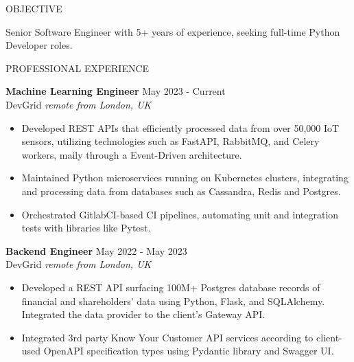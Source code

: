 \documentclass{resume} %
\begin{document}

\begin{rSection}{OBJECTIVE}

{Senior Software Engineer with 5+ years of experience, seeking full-time Python Developer roles.}


\end{rSection}

\begin{rSection}{PROFESSIONAL EXPERIENCE}

\textbf{Machine Learning Engineer} \hfill May 2023 - Current\\
DevGrid \hfill \textit{remote from London, UK}
 \begin{itemize}
    \itemsep -3pt {} 
     \item Developed REST APIs that efficiently processed data from over 50,000 IoT sensors, utilizing technologies such as FastAPI, RabbitMQ, and Celery workers, maily through a Event-Driven architecture.
     \item Maintained Python microservices running on Kubernetes clusters, integrating and processing data from databases such as Cassandra, Redis and Postgres.
     \item Orchestrated GitlabCI-based CI pipelines, automating unit and integration tests with libraries like Pytest.

 \end{itemize}
 
\textbf{Backend Engineer} \hfill May 2022 - May 2023\\
DevGrid \hfill \textit{remote from London, UK}
 \begin{itemize}
    \itemsep -3pt {} 
     \item Developed a REST API surfacing 100M+ Postgres database records of financial and shareholders' data using Python, Flask, and SQLAlchemy. Integrated the data provider to the client's Gateway API.
     \item Integrated 3rd party Know Your Customer API services according to client-used OpenAPI specification types using Pydantic library and Swagger UI.
 \end{itemize}


\end{rSection}
\end{document}
